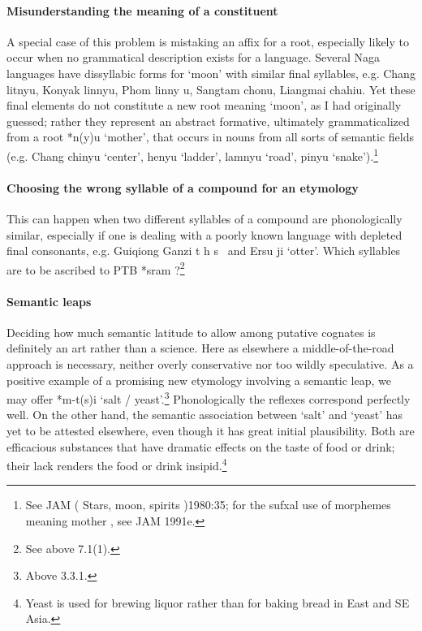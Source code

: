 \documentclass[10pt]{article}
\begin{document}
\paragraph{Misunderstanding the meaning of a constituent}
A special case of this problem is mistaking an affix for a root, especially likely to occur when no grammatical description exists for a language. Several Naga languages have dissyllabic forms for `moon' with similar final syllables, e.g. Chang litnyu, Konyak linnyu, Phom linny u, Sangtam chonu, Liangmai chahiu. Yet these final elements do not constitute a new root meaning `moon', as I had originally guessed; rather they represent an abstract formative, ultimately grammaticalized from a root *n(y)u `mother', that occurs in nouns from all sorts of semantic fields (e.g. Chang chinyu `center', henyu `ladder', lamnyu `road', pinyu `snake').\footnote{See JAM ( Stars, moon, spirits )1980:35; for the suf\xde xal use of morphemes meaning  mother , see JAM 1991e.}

\paragraph{Choosing the wrong syllable of a compound for an etymology}
This can happen when two different syllables of a compound are phonologically similar, especially if one is dealing with a poorly known language with depleted final consonants, e.g. Guiqiong Ganzi t h\xfa {}   s~    and Ersu  \xbd {}   ji   `otter'. Which syllables are to be ascribed to PTB *sram ?\footnote{See above 7.1(1).}

\paragraph{Semantic leaps}
Deciding how much semantic latitude to allow among putative cognates is definitely an art rather than a science. Here as elsewhere a middle-of-the-road approach is necessary, neither overly conservative nor too wildly speculative. As a positive example of a promising new etymology involving a semantic leap, we may offer *m-t(s)i `salt / yeast'.\footnote{Above 3.3.1.} Phonologically the reflexes correspond perfectly well. On the other hand, the semantic association between `salt' and `yeast' has yet to be attested elsewhere, even though it has great initial plausibility. Both are efficacious substances that have dramatic effects on the taste of food or drink; their lack renders the food or drink insipid.\footnote{Yeast is used for brewing liquor rather than for baking bread in East and SE Asia.}
\end{document}
